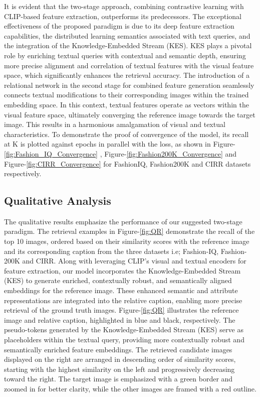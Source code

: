 \documentclass[10pt,lineno]{wlpeerj}
\begin{document}
It is evident that the two-stage approach, combining contrastive learning with CLIP-based feature extraction, outperforms its predecessors. The exceptional effectiveness of the proposed paradigm is due to its deep feature extraction capabilities, the distributed learning semantics associated with text queries, and the integration of the Knowledge-Embedded Stream (KES). KES plays a pivotal role by enriching textual queries with contextual and semantic depth, ensuring more precise alignment and correlation of textual features with the visual feature space, which significantly enhances the retrieval accuracy. The introduction of a relational network in the second stage for combined feature generation seamlessly connects textual modifications to their corresponding images within the trained embedding space. 
In this context, textual features operate as vectors within the visual feature space, ultimately converging the reference image towards the target image.
This results in a harmonious amalgamation of visual and textual characteristics. To demonstrate the proof of convergence of the model, its recall at K is plotted against epochs in parallel with the loss, as shown in Figure-\ref{fig:Fashion_IQ_Convergence} , Figure-\ref{fig:Fashion200K_Convergence} and Figure-\ref{fig:CIRR_Convergence} \color{black} for FashionIQ, Fashion200K and CIRR datasets respectively.

\subsection*{Qualitative Analysis}
The qualitative results emphasize the performance of our suggested two-stage paradigm. The retrieval examples in Figure-\ref{fig:QR} demonstrate the recall of the top 10 images, ordered based on their similarity scores with the reference image and its corresponding caption from the three datasets i.e; Fashion-IQ, Fashion-200K and CIRR. Along with leveraging CLIP's visual and textual encoders for feature extraction, our model incorporates the Knowledge-Embedded Stream (KES) to generate enriched, contextually robust, and semantically aligned embeddings for the reference image. 
These enhanced semantic and attribute representations are integrated into the relative caption, enabling more precise retrieval of the ground truth images. Figure-\ref{fig:QR} illustrates the reference image and relative caption, highlighted in blue and black, respectively. The pseudo-tokens generated by the Knowledge-Embedded Stream (KES) serve as placeholders within the textual query, providing more contextually robust and semantically enriched feature embeddings. The retrieved candidate images displayed on the right are arranged in descending order of similarity scores, starting with the highest similarity on the left and progressively decreasing toward the right. The target image is emphasized with a green border and zoomed in for better clarity, while the other images are framed with a red outline.
\end{document}

